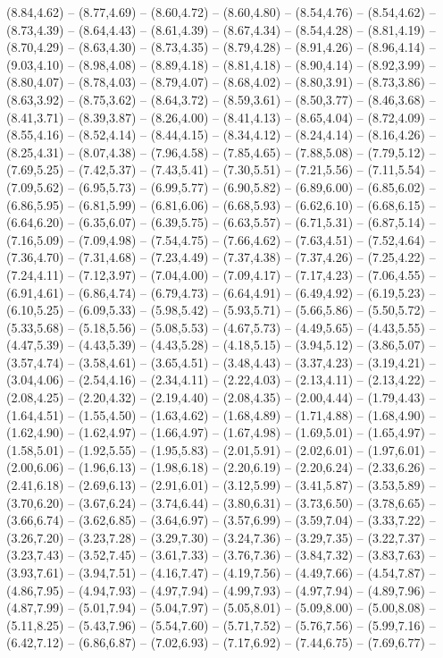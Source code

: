{  (8.84,4.62) -- (8.77,4.69) -- (8.60,4.72) -- (8.60,4.80) -- (8.54,4.76) -- (8.54,4.62) -- (8.73,4.39) -- (8.64,4.43) -- (8.61,4.39) -- (8.67,4.34) -- (8.54,4.28) -- (8.81,4.19) -- (8.70,4.29) -- (8.63,4.30) -- (8.73,4.35) -- (8.79,4.28) -- (8.91,4.26) -- (8.96,4.14) -- (9.03,4.10) -- (8.98,4.08) -- (8.89,4.18) -- (8.81,4.18) -- (8.90,4.14) -- (8.92,3.99) -- (8.80,4.07) -- (8.78,4.03) -- (8.79,4.07) -- (8.68,4.02) -- (8.80,3.91) -- (8.73,3.86) -- (8.63,3.92) -- (8.75,3.62) -- (8.64,3.72) -- (8.59,3.61) -- (8.50,3.77) -- (8.46,3.68) -- (8.41,3.71) -- (8.39,3.87) -- (8.26,4.00) -- (8.41,4.13) -- (8.65,4.04) -- (8.72,4.09) -- (8.55,4.16) -- (8.52,4.14) -- (8.44,4.15) -- (8.34,4.12) -- (8.24,4.14) -- (8.16,4.26) -- (8.25,4.31) -- (8.07,4.38) -- (7.96,4.58) -- (7.85,4.65) -- (7.88,5.08) -- (7.79,5.12) -- (7.69,5.25) -- (7.42,5.37) -- (7.43,5.41) -- (7.30,5.51) -- (7.21,5.56) -- (7.11,5.54) -- (7.09,5.62) -- (6.95,5.73) -- (6.99,5.77) -- (6.90,5.82) -- (6.89,6.00) -- (6.85,6.02) -- (6.86,5.95) -- (6.81,5.99) -- (6.81,6.06) -- (6.68,5.93) -- (6.62,6.10) -- (6.68,6.15) -- (6.64,6.20) -- (6.35,6.07) -- (6.39,5.75) -- (6.63,5.57) -- (6.71,5.31) -- (6.87,5.14) -- (7.16,5.09) -- (7.09,4.98) -- (7.54,4.75) -- (7.66,4.62) -- (7.63,4.51) -- (7.52,4.64) -- (7.36,4.70) -- (7.31,4.68) -- (7.23,4.49) -- (7.37,4.38) -- (7.37,4.26) -- (7.25,4.22) -- (7.24,4.11) -- (7.12,3.97) -- (7.04,4.00) -- (7.09,4.17) -- (7.17,4.23) -- (7.06,4.55) -- (6.91,4.61) -- (6.86,4.74) -- (6.79,4.73) -- (6.64,4.91) -- (6.49,4.92) -- (6.19,5.23) -- (6.10,5.25) -- (6.09,5.33) -- (5.98,5.42) -- (5.93,5.71) -- (5.66,5.86) -- (5.50,5.72) -- (5.33,5.68) -- (5.18,5.56) -- (5.08,5.53) -- (4.67,5.73) -- (4.49,5.65) -- (4.43,5.55) -- (4.47,5.39) -- (4.43,5.39) -- (4.43,5.28) -- (4.18,5.15) -- (3.94,5.12) -- (3.86,5.07) -- (3.57,4.74) -- (3.58,4.61) -- (3.65,4.51) -- (3.48,4.43) -- (3.37,4.23) -- (3.19,4.21) -- (3.04,4.06) -- (2.54,4.16) -- (2.34,4.11) -- (2.22,4.03) -- (2.13,4.11) -- (2.13,4.22) -- (2.08,4.25) -- (2.20,4.32) -- (2.19,4.40) -- (2.08,4.35) -- (2.00,4.44) -- (1.79,4.43) -- (1.64,4.51) -- (1.55,4.50) -- (1.63,4.62) -- (1.68,4.89) -- (1.71,4.88) -- (1.68,4.90) -- (1.62,4.90) -- (1.62,4.97) -- (1.66,4.97) -- (1.67,4.98) -- (1.69,5.01) -- (1.65,4.97) -- (1.58,5.01) -- (1.92,5.55) -- (1.95,5.83) -- (2.01,5.91) -- (2.02,6.01) -- (1.97,6.01) -- (2.00,6.06) -- (1.96,6.13) -- (1.98,6.18) -- (2.20,6.19) -- (2.20,6.24) -- (2.33,6.26) -- (2.41,6.18) -- (2.69,6.13) -- (2.91,6.01) -- (3.12,5.99) -- (3.41,5.87) -- (3.53,5.89) -- (3.70,6.20) -- (3.67,6.24) -- (3.74,6.44) -- (3.80,6.31) -- (3.73,6.50) -- (3.78,6.65) -- (3.66,6.74) -- (3.62,6.85) -- (3.64,6.97) -- (3.57,6.99) -- (3.59,7.04) -- (3.33,7.22) -- (3.26,7.20) -- (3.23,7.28) -- (3.29,7.30) -- (3.24,7.36) -- (3.29,7.35) -- (3.22,7.37) -- (3.23,7.43) -- (3.52,7.45) -- (3.61,7.33) -- (3.76,7.36) -- (3.84,7.32) -- (3.83,7.63) -- (3.93,7.61) -- (3.94,7.51) -- (4.16,7.47) -- (4.19,7.56) -- (4.49,7.66) -- (4.54,7.87) -- (4.86,7.95) -- (4.94,7.93) -- (4.97,7.94) -- (4.99,7.93) -- (4.97,7.94) -- (4.89,7.96) -- (4.87,7.99) -- (5.01,7.94) -- (5.04,7.97) -- (5.05,8.01) -- (5.09,8.00) -- (5.00,8.08) -- (5.11,8.25) -- (5.43,7.96) -- (5.54,7.60) -- (5.71,7.52) -- (5.76,7.56) -- (5.99,7.16) -- (6.42,7.12) -- (6.86,6.87) -- (7.02,6.93) -- (7.17,6.92) -- (7.44,6.75) -- (7.69,6.77) -- }
